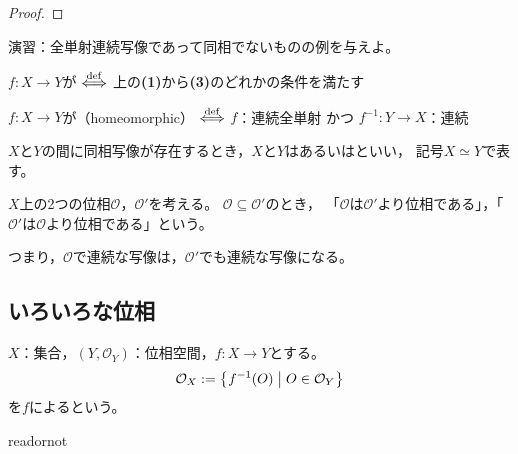 \documentclass[uplatex]{jsarticle}
\begin{document}
\begin{proof}



\end{proof}

演習：全単射連続写像であって同相でないものの例を与えよ。

\begin{teigi}
   $f \colon X \longrightarrow Y$が $\overset{\mathrm{def}}{\Longleftrightarrow}$ 上の{\bf (1)}から{\bf (3)}のどれかの条件を満たす

   $f \colon X \longrightarrow Y$が（homeomorphic） $\overset{\mathrm{def}}{\Longleftrightarrow}$ $f$：連続全単射 かつ $f^{-1} \colon Y \longrightarrow X$：連続

  $X$と$Y$の間に同相写像が存在するとき，$X$と$Y$はあるいはといい，
  記号$X \simeq Y$で表す。
\end{teigi}

\begin{teigi}
  $X$上の2つの位相$\mathcal{O}$，$\mathcal{O}'$を考える。
  $\mathcal{O} \subseteq \mathcal{O}'$のとき，
  「$\mathcal{O}$は$\mathcal{O}'$より位相である」，「$\mathcal{O}'$は$\mathcal{O}$より位相である」という。
\end{teigi}

つまり，$\mathcal{O}$で連続な写像は，$\mathcal{O}'$でも連続な写像になる。

\subsection{いろいろな位相}

\begin{teigi}
  $X$：集合，$(Y,\mathcal{O}_{Y})$：位相空間，$f \colon X \longrightarrow Y$とする。
  \begin{equation}
    \mathcal{O}_{X} := \Set{\hspace{-1.8pt} f^{-1}(O) | O \in \mathcal{O}_{Y} \hspace{-1.8pt}}
  \end{equation}
  を$f$によるという。
\end{teigi}



\expandafter\ifx\csname readornot\endcsname\relax
  
\end{document}
